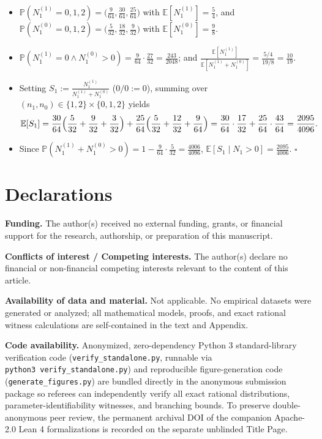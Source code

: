 \documentclass[11pt,a4paper]{article}
\providecommand{\tightlist}{\setlength{\itemsep}{2pt}\setlength{\parskip}{0pt}}
\begin{document}
\begin{itemize}
\tightlist
\item
  \(\mathbb{P}(N_1^{(1)} = 0,1,2) = \bigl(\frac{9}{64}, \frac{30}{64}, \frac{25}{64}\bigr)\)
  with \(\mathbb{E}[N_1^{(1)}] = \frac{5}{4}\), and
  \(\mathbb{P}(N_1^{(0)} = 0,1,2) = \bigl(\frac{5}{32}, \frac{18}{32}, \frac{9}{32}\bigr)\)
  with \(\mathbb{E}[N_1^{(0)}] = \frac{9}{8}\).
\item
  \(\mathbb{P}(N_1^{(1)} = 0 \land N_1^{(0)} > 0) = \frac{9}{64} \cdot \frac{27}{32} = \frac{243}{2048}\);
  and
  \(\frac{\mathbb{E}[N_1^{(1)}]}{\mathbb{E}[N_1^{(1)} + N_1^{(0)}]} = \frac{5/4}{19/8} = \frac{10}{19}\).
\item
  Setting \(S_1 := \frac{N_1^{(1)}}{N_1^{(1)} + N_1^{(0)}}\)
  (\(0/0 := 0\)), summing over
  \((n_1, n_0) \in \{1,2\} \times \{0,1,2\}\) yields
  \[\mathbb{E}[S_1] = \frac{30}{64}\Bigl(\frac{5}{32} + \frac{9}{32} + \frac{3}{32}\Bigr) + \frac{25}{64}\Bigl(\frac{5}{32} + \frac{12}{32} + \frac{9}{64}\Bigr) = \frac{30}{64}\cdot\frac{17}{32} + \frac{25}{64}\cdot\frac{43}{64} = \frac{2095}{4096}.\]
\item
  Since
  \(\mathbb{P}(N_1^{(1)} + N_1^{(0)} > 0) = 1 - \frac{9}{64}\cdot\frac{5}{32} = \frac{4006}{4096}\),
  \(\mathbb{E}[S_1 \mid N_1 > 0] = \frac{2095}{4006}\). \(\square\)
\end{itemize}

\section*{Declarations}\label{declarations}

\textbf{Funding.} The author(s) received no external funding, grants, or
financial support for the research, authorship, or preparation of this
manuscript.

\textbf{Conflicts of interest / Competing interests.} The author(s)
declare no financial or non-financial competing interests relevant to
the content of this article.

\textbf{Availability of data and material.} Not applicable. No empirical
datasets were generated or analyzed; all mathematical models, proofs,
and exact rational witness calculations are self-contained in the text
and Appendix.

\textbf{Code availability.} Anonymized, zero-dependency Python 3
standard-library verification code (\texttt{verify\_standalone.py},
runnable via \texttt{python3\ verify\_standalone.py}) and reproducible
figure-generation code (\texttt{generate\_figures.py}) are bundled
directly in the anonymous submission package so referees can
independently verify all exact rational distributions,
parameter-identifiability witnesses, and branching bounds. To preserve
double-anonymous peer review, the permanent archival DOI of the
companion Apache-2.0 Lean 4 formalizations is recorded on the separate
unblinded Title Page.
\end{document}
